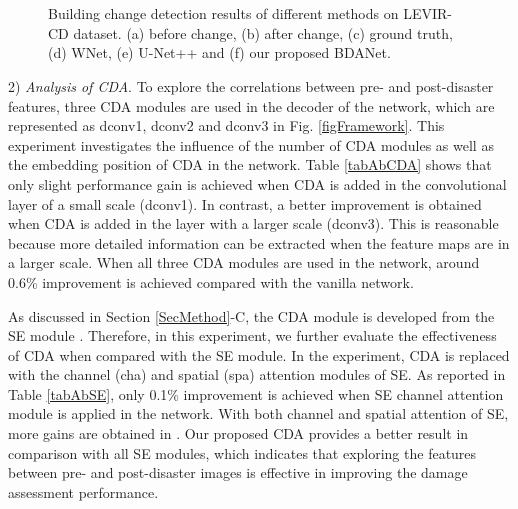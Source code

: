 \documentclass[journal]{IEEEtran}
\begin{document}
\begin{figure*}[t]
	     \hspace{-2.5mm}  
	    \hspace{-2.5mm}   \\
	    	   \hspace{-2.5mm}  
	    \hspace{-2.5mm}  
	 \hspace{-2.5mm}  
	  \hspace{-2.5mm}       
	     \hspace{-2.5mm}  
	    \hspace{-2.5mm}   \\
	\caption{Building change detection results of different methods on LEVIR-CD dataset. (a) before change, (b) after change, (c) ground truth, (d) WNet, (e) U-Net++  and (f) our proposed BDANet. }
	\label{figImgCD}
\end{figure*}

2) \textit{Analysis of CDA}. To explore the correlations between pre- and post-disaster features, three CDA modules are used in the decoder of the network, which are represented as dconv1, dconv2 and dconv3 in Fig. \ref{figFramework}. This experiment investigates the influence of the number of CDA modules as well as the embedding position of CDA in the network.  Table \ref{tabAbCDA} shows that only slight performance gain is achieved when CDA is added in the convolutional layer of a small scale (dconv1). In contrast, a better improvement is obtained when CDA is added in the layer with a larger scale (dconv3). This is reasonable because more detailed information can be extracted when the feature maps are in a larger scale. When all three CDA modules are used in the network, around 0.6\% improvement is achieved compared with the vanilla network.

As discussed in Section \ref{SecMethod}-C, the CDA module is developed from the SE module \cite{royRecalibratingFullyConvolutional2019}. Therefore, in this experiment, we further evaluate the effectiveness of CDA when compared with the SE module. In the experiment, CDA is replaced with the channel (cha) and spatial (spa) attention modules of SE. As reported in Table \ref{tabAbSE}, only 0.1\% improvement is achieved when SE channel attention module is applied in the network. With both channel and spatial attention of SE, more gains are obtained in . Our proposed CDA provides a better result in comparison with all SE modules, which indicates that exploring the features between pre- and post-disaster images is effective in improving the damage assessment performance.
\end{document}
